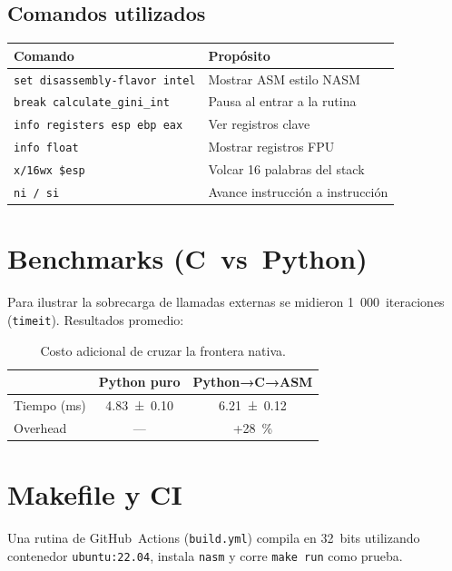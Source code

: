 \documentclass[a4paper,12pt]{article}
\begin{document}
\subsection{Comandos utilizados}
\begin{tabular}{@{}ll@{}}
\toprule
\textbf{Comando} & \textbf{Propósito} \\ \midrule
\lstinline|set disassembly-flavor intel| & Mostrar ASM estilo NASM \\
\lstinline|break calculate_gini_int| & Pausa al entrar a la rutina \\
\lstinline|info registers esp ebp eax| & Ver registros clave \\
\lstinline|info float| & Mostrar registros FPU \\
\lstinline|x/16wx $esp| & Volcar 16 palabras del stack \\
\lstinline|ni / si| & Avance instrucción a instrucción \\
\bottomrule
\end{tabular}


\section{Benchmarks (C vs Python)}
Para ilustrar la sobrecarga de llamadas externas se midieron 1 000 iteraciones
(\texttt{timeit}).  Resultados promedio:

\begin{table}[H]
  \centering
  \begin{tabular}{lcc}
  \toprule
                 & \textbf{Python puro} & \textbf{Python→C→ASM} \\ \midrule
  Tiempo (ms)    & 4.83 ± 0.10          & 6.21 ± 0.12 \\
  Overhead       & —                    & +28 \% \\
  \bottomrule
  \end{tabular}
  \caption{Costo adicional de cruzar la frontera nativa.}
\end{table}

\section{Makefile y CI}


Una rutina de GitHub Actions (\texttt{build.yml}) compila en 32 bits utilizando
contenedor \lstinline|ubuntu:22.04|, instala \texttt{nasm} y corre \lstinline|make run|
como prueba.
\end{document}
